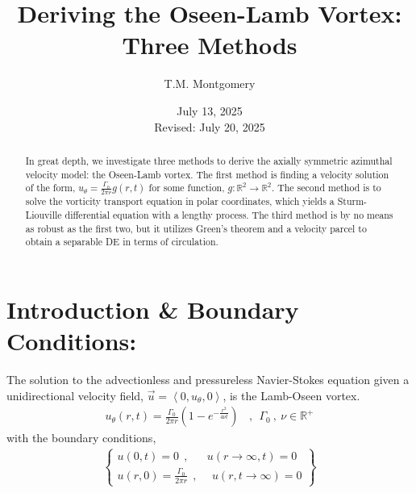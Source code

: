 \documentclass{article}
\title{Deriving the Oseen-Lamb Vortex: Three Methods}
\author{T.M. Montgomery}
\date{July 13, 2025 \\ Revised: July 20, 2025}
\begin{document}
\maketitle

\tableofcontents

\begin{abstract}
    In great depth, we investigate three methods to derive the axially symmetric azimuthal velocity model: the Oseen-Lamb vortex. The first method is finding a velocity solution of the form, $u_\theta =\frac{\Gamma_0}{2\pi r}g(r,t)$ for some function, $g:\mathbb{R}^2\rightarrow\mathbb{R}^2$. The second method is to solve the vorticity transport equation in polar coordinates, which yields a Sturm-Liouville differential equation with a lengthy process. The third method is by no means as robust as the first two, but it utilizes Green's theorem and a velocity parcel to obtain a separable DE in terms of circulation.
\end{abstract}

\section*{Introduction \& Boundary Conditions:}
The solution to the advectionless and pressureless Navier-Stokes equation given a unidirectional velocity field, $\vec{u}=\left< 0,u_\theta ,0\right>$, is the Lamb-Oseen vortex.
\begin{align}\label{Eq1}
u_{\theta} (r,t) = \frac{\Gamma_0}{2\pi r}\left(1-e^{-\frac{r^2}{4\nu t}}\right) \:\:\:\:,\:\: \Gamma_0 \:,\: \nu \in \mathbb{R}^+
\end{align}
with the boundary conditions, 
\begin{align*}
    \left\{\begin{matrix}
    u(0,t)= 0 \:\:,& u(r\to \infty ,t)=0 \\ u(r,0)=\frac{\Gamma_0}{2\pi r} \:\:,& \:\: u(r,t\to \infty)=0
    \end{matrix}\right\}
\end{align*}
\end{document}
